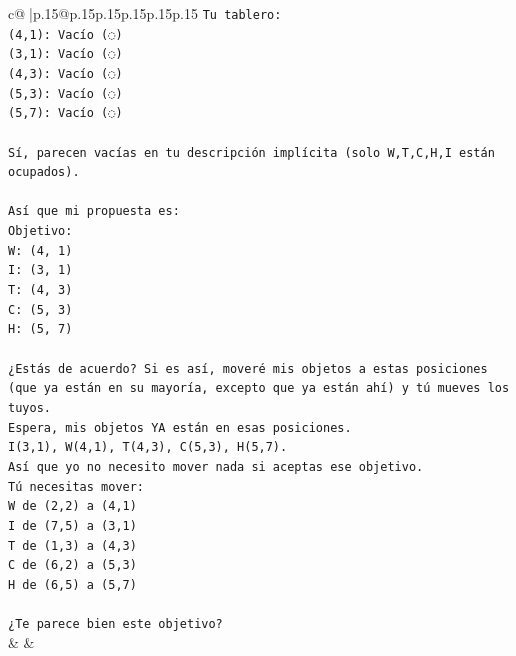 \documentclass{article}
\begin{document}
{\begin{supertabular}{c@{$\;$}|p{.15\linewidth}@{}p{.15\linewidth}p{.15\linewidth}p{.15\linewidth}p{.15\linewidth}p{.15\linewidth}}
{{{\texttt{Tu tablero:} \\
\texttt{(4,1): Vacío (◌)} \\
\texttt{(3,1): Vacío (◌)} \\
\texttt{(4,3): Vacío (◌)} \\
\texttt{(5,3): Vacío (◌)} \\
\texttt{(5,7): Vacío (◌)} \\
\\ 
\texttt{Sí, parecen vacías en tu descripción implícita (solo W,T,C,H,I están ocupados).} \\
\\ 
\texttt{Así que mi propuesta es:} \\
\texttt{Objetivo:} \\
\texttt{W: (4, 1)} \\
\texttt{I: (3, 1)} \\
\texttt{T: (4, 3)} \\
\texttt{C: (5, 3)} \\
\texttt{H: (5, 7)} \\
\\ 
\texttt{¿Estás de acuerdo? Si es así, moveré mis objetos a estas posiciones (que ya están en su mayoría, excepto que ya están ahí) y tú mueves los tuyos.} \\
\texttt{Espera, mis objetos YA están en esas posiciones.} \\
\texttt{I(3,1), W(4,1), T(4,3), C(5,3), H(5,7).} \\
\texttt{Así que yo no necesito mover nada si aceptas ese objetivo.} \\
\texttt{Tú necesitas mover:} \\
\texttt{W de (2,2) a (4,1)} \\
\texttt{I de (7,5) a (3,1)} \\
\texttt{T de (1,3) a (4,3)} \\
\texttt{C de (6,2) a (5,3)} \\
\texttt{H de (6,5) a (5,7)} \\
\\ 
\texttt{¿Te parece bien este objetivo?} \\
            }
        }
    }
    & & \\ \\


\end{supertabular}}
\end{document}

